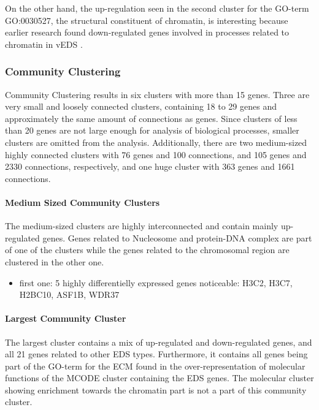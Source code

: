 On the other hand, the up-regulation seen in the second cluster for the GO-term GO:0030527, the structural constituent of chromatin, is interesting because earlier research found down-regulated genes involved in processes related to chromatin in vEDS \cite{Chiarelli2018}.


\subsubsection{Community Clustering}

Community Clustering results in six clusters with more than 15 genes. Three are very small and loosely connected clusters, containing 18 to 29 genes and approximately the same amount of connections as genes. Since clusters of less than 20 genes are not large enough for analysis of biological processes, smaller clusters are omitted from the analysis. Additionally, there are two medium-sized highly connected clusters with 76 genes and 100 connections, and 105 genes and 2330 connections, respectively, and one huge cluster with 363 genes and 1661 connections.

\paragraph{Medium Sized Community Clusters}

The medium-sized clusters are highly interconnected and contain mainly up-regulated genes. Genes related to Nucleosome and protein-DNA complex are part of one of the clusters while the genes related to the chromosomal region are clustered in the other one.
\begin{itemize}
	\item first one: 5 highly differentielly expressed genes noticeable: H3C2, H3C7, H2BC10, ASF1B, WDR37
\end{itemize}


\paragraph{Largest Community Cluster}

The largest cluster contains a mix of up-regulated and down-regulated genes, and all 21 genes related to other EDS types. Furthermore, it contains all  genes being part of the GO-term for the ECM found in the over-representation of molecular functions of the MCODE cluster containing the EDS genes. The molecular cluster showing enrichment towards the chromatin part is not a part of this community cluster.

